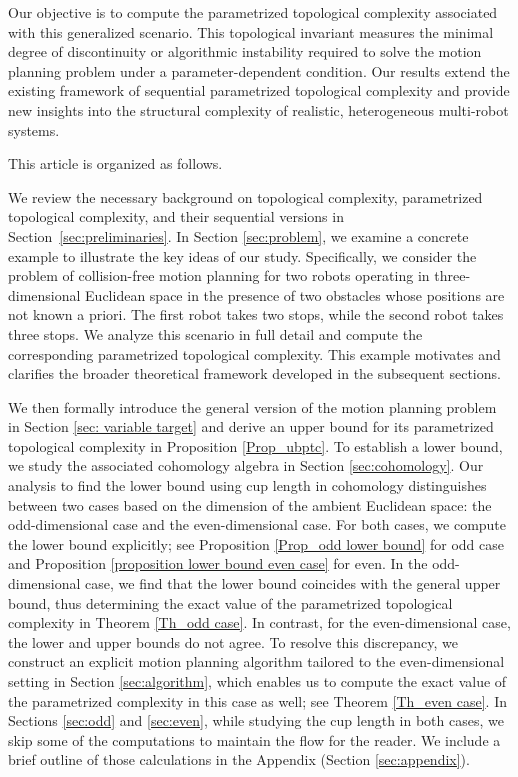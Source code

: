 \documentclass[12pt,oneside,reqno]{amsart}
\theoremstyle{plain}
\theoremstyle{definition}
\theoremstyle{remark}
\begin{document}
Our objective is to compute the parametrized topological complexity associated with this generalized scenario. This topological invariant measures the minimal degree of discontinuity or algorithmic instability required to solve the motion planning problem under a parameter-dependent condition. Our results extend the existing framework of sequential parametrized topological complexity and provide new insights into the structural complexity of realistic, heterogeneous multi-robot systems.

This article is organized as follows. 

We review the necessary background on topological complexity, parametrized topological complexity, and their sequential versions in Section~\ref{sec:preliminaries}. In Section \ref{sec:problem}, we examine a concrete example to illustrate the key ideas of our study. Specifically, we consider the problem of collision-free motion planning for two robots operating in three-dimensional Euclidean space in the presence of two obstacles whose positions are not known a priori. The first robot takes two stops, while the second robot takes three stops. We analyze this scenario in full detail and compute the corresponding parametrized topological complexity. This example motivates and clarifies the broader theoretical framework developed in the subsequent sections.

We then formally introduce the general version of the motion planning problem in Section \ref{sec: variable target} and derive an upper bound for its parametrized topological complexity in Proposition \ref{Prop_ubptc}.
To establish a lower bound, we study the associated cohomology algebra in Section \ref{sec:cohomology}.
Our analysis to find the lower bound using cup length in cohomology distinguishes between two cases based on the dimension of the ambient Euclidean space: the odd-dimensional case and the even-dimensional case.
For both cases, we compute the lower bound explicitly; see Proposition \ref{Prop_odd lower bound} for odd case and Proposition \ref{proposition lower bound even case} for even. In the odd-dimensional case, we find that the lower bound coincides with the general upper bound, thus determining the exact value of the parametrized topological complexity in Theorem \ref{Th_odd case}. 
In contrast, for the even-dimensional case, the lower and upper bounds do not agree. To resolve this discrepancy, we construct an explicit motion planning algorithm tailored to the even-dimensional setting in Section \ref{sec:algorithm}, which enables us to compute the exact value of the parametrized complexity in this case as well; see Theorem \ref{Th_even case}.
In Sections \ref{sec:odd} and \ref{sec:even}, while studying the cup length in both cases, we skip some of the computations to maintain the flow for the reader. We include a brief outline of those calculations in the Appendix (Section \ref{sec:appendix}).
\end{document}

